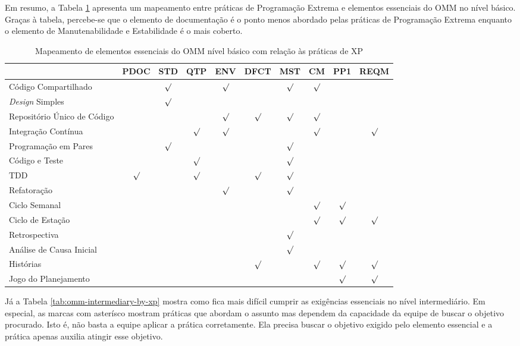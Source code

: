 Em resumo, a Tabela \ref{tab:omm-basic-by-xp} apresenta um mapeamento
entre práticas de Programação Extrema e elementos essenciais do
OMM no nível básico. Graças à tabela, percebe-se que o elemento de documentação é o
ponto menos abordado pelas práticas de Programação Extrema enquanto o
elemento de Manutenabilidade e Estabilidade é o mais coberto.

\begin{table}
  \centering
  \begin{tabular}{|p{4cm}|c|c|c|c|c|c|c|c|c|}
    \hline
    & PDOC & STD & QTP & ENV & DFCT & MST & CM & PP1 & REQM \\
    \hline
    Código Compartilhado & & $\surd$ & & $\surd$ & & $\surd$ & $\surd$ & & \\
    \hline
    \textit{Design} Simples & & $\surd$ & & & & & & & \\
    \hline
    Repositório Único de Código & & & & $\surd$ & $\surd$ & $\surd$ & $\surd$ & & \\
    \hline
    Integração Contínua & & & $\surd$ & $\surd$ & & & $\surd$ & & $\surd$ \\
    \hline
    Programação em Pares & & $\surd$ & & & & $\surd$ & & & \\
    \hline
    Código e Teste & & & $\surd$ & & & $\surd$ & & & \\
    \hline
    TDD & $\surd$ & & $\surd$ & & $\surd$ & $\surd$ & & & \\
    \hline
    Refatoração & & & & $\surd$ & & $\surd$ & & & \\
    \hline
    Ciclo Semanal & & & & & & & $\surd$ & $\surd$ & \\
    \hline
    Ciclo de Estação & & & & & & & $\surd$ & $\surd$ & $\surd$ \\
    \hline
    Retrospectiva & & & & & & $\surd$ & & & \\
    \hline
    Análise de Causa Inicial & & & & & & $\surd$ & & & \\
    \hline
    Histórias & & & & & $\surd$ & & $\surd$ & $\surd$ & $\surd$ \\
    \hline
    Jogo do Planejamento & & & & & & & & $\surd$ & $\surd$ \\
    \hline
  \end{tabular}
  \caption{Mapeamento de elementos essenciais do OMM nível básico com relação às práticas de XP}
  \label{tab:omm-basic-by-xp}
\end{table}

Já a Tabela \ref{tab:omm-intermediary-by-xp} mostra como fica mais
difícil cumprir as exigências essenciais no nível intermediário. Em
especial, as marcas com asterísco mostram práticas que abordam o
assunto mas dependem da capacidade da equipe de buscar o objetivo
procurado. Isto é, não basta a equipe aplicar a prática
corretamente. Ela precisa buscar o objetivo exigido pelo elemento
essencial e a prática apenas auxilia atingir esse objetivo.

